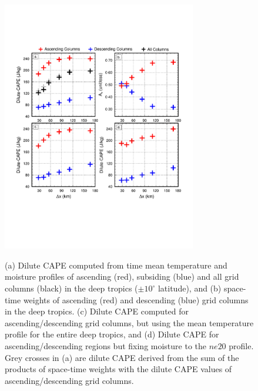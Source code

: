 \documentclass[alpha-refs]{wiley-article}
\begin{document}
\begin{figure}
\begin{center}
\noindent\includegraphics[width=20pc,angle=0]{figs/temp_cape.pdf}\\
\end{center}
\caption{(a) Dilute CAPE computed from time mean temperature and moisture profiles of ascending (red), subsiding (blue) and all grid columns (black) in the deep tropics ($\pm 10^{\circ}$ latitude), and (b) space-time weights of ascending (red) and descending (blue) grid columns in the deep tropics. (c) Dilute CAPE computed for ascending/descending grid columns, but using the mean temperature profile for the entire deep tropics, and (d) Dilute CAPE for ascending/descending regions but fixing moisture to the $ne20$ profile. Grey crosses in (a) are dilute CAPE derived from the sum of the products of space-time weights with the dilute CAPE values of ascending/descending grid columns.}
\label{fig:cape}
\end{figure}
\end{document}
